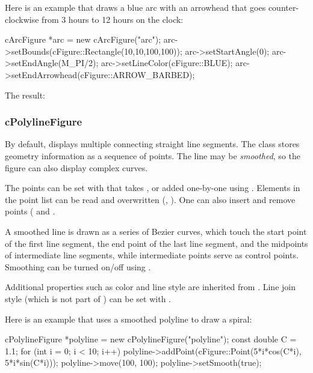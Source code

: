Here is an example that draws a blue arc with an arrowhead that goes
counter-clockwise from 3 hours to 12 hours on the clock:

\begin{cpp}
cArcFigure *arc = new cArcFigure("arc");
arc->setBounds(cFigure::Rectangle(10,10,100,100));
arc->setStartAngle(0);
arc->setEndAngle(M_PI/2);
arc->setLineColor(cFigure::BLUE);
arc->setEndArrowhead(cFigure::ARROW_BARBED);
\end{cpp}


The result:

\begin{center}

\end{center}


\subsubsection{cPolylineFigure}
\label{sec:graphics:polylinefigure}

By default,  displays multiple connecting straight
line segments. The class stores geometry information as a sequence of
points. The line may be \textit{smoothed}, so the figure can also display
complex curves.

The points can be set with  that takes ,
or added one-by-one using . Elements in the point list can be
read and overwritten (, ). One can also
insert and remove points ( and .

A smoothed line is drawn as a series of Bezier curves, which touch the
start point of the first line segment, the end point of the last line
segment, and the midpoints of intermediate line segments, while
intermediate points serve as control points. Smoothing can be turned on/off
using .

Additional properties such as color and line style are inherited from
. Line join style (which is not part of
) can be set with .

Here is an example that uses a smoothed polyline to draw a spiral:

\begin{cpp}
cPolylineFigure *polyline = new cPolylineFigure("polyline");
const double C = 1.1;
for (int i = 0; i < 10; i++)
    polyline->addPoint(cFigure::Point(5*i*cos(C*i), 5*i*sin(C*i)));
polyline->move(100, 100);
polyline->setSmooth(true);
\end{cpp}

